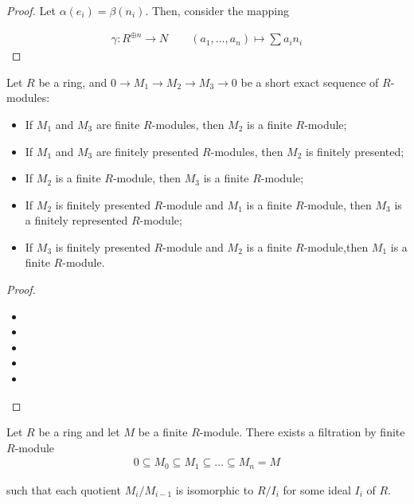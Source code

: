 \documentclass[Total.tex]{subfiles}
\begin{document}
			\begin{proof}
				Let $\alpha(e_i)=\beta(n_i)$. Then, consider the mapping
				
				\begin{gather*}
					\gamma:R^{\oplus n}\rightarrow N\qquad (a_1,\dots,a_n)\mapsto \sum a_i n_i
				\end{gather*}
			\end{proof}
			
			\begin{lemma}
				Let $R$ be a ring, and $0\rightarrow M_1\rightarrow M_2\rightarrow M_3\rightarrow 0$ be a short exact sequence of $R$-modules:
				
				\begin{itemize}
					\item If $M_1$ and $M_3$ are finite $R$-modules, then $M_2$ is a finite $R$-module;
					\item If $M_1$ and $M_3$ are finitely presented $R$-modules, then $M_2$ is finitely presented;
					\item If $M_2$ is a finite $R$-module, then $M_3$ is a finite $R$-module;
					\item If $M_2$ is finitely presented $R$-module and $M_1$ is a finite $R$-module, then $M_3$ is a finitely represented $R$-module;
					\item If $M_3$ is finitely presented $R$-module and $M_2$ is a finite $R$-module,then $M_1$ is a finite $R$-module. 
				\end{itemize}
			\end{lemma}
			
			\begin{proof}
				\begin{itemize}
					\item 
					\item 
					\item 
					\item 
					\item 
				\end{itemize}
			\end{proof}
			
			\begin{lemma}
				Let $R$ be a ring and let $M$ be a finite $R$-module. There exists a filtration by finite $R$-module 
				\begin{gather*}
					0\subseteq M_0 \subseteq M_1\subseteq \dots\subseteq M_n=M
				\end{gather*}
				
				such that each quotient $M_i/M_{i-1}$ is isomorphic to $R/I_i$ for some ideal $I_i$ of $R$.
			\end{lemma}
			
\end{document}
